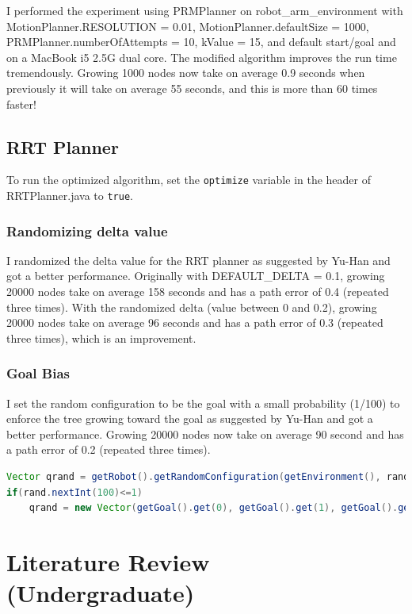 \documentclass[9.5pt]{extarticle}
\begin{document}
I performed the experiment using PRMPlanner on robot\_arm\_environment with MotionPlanner.RESOLUTION = 0.01, MotionPlanner.defaultSize = 1000, PRMPlanner.numberOfAttempts = 10, kValue = 15, and default start/goal and on a MacBook i5 2.5G dual core. The modified algorithm improves the run time tremendously. Growing 1000 nodes now take on average 0.9 seconds when previously it will take on average 55 seconds, and this is more than 60 times faster!


\subsection{RRT Planner}

To run the optimized algorithm, set the \verb`optimize` variable in the header of RRTPlanner.java to \verb`true`.

\subsubsection{Randomizing delta value}

I randomized the delta value for the RRT planner as suggested by Yu-Han and got a better performance. Originally with DEFAULT\_DELTA = 0.1, growing 20000 nodes take on average 158 seconds and has  a path error of 0.4 (repeated three times). With the randomized delta (value between 0 and 0.2), growing 20000 nodes take on average 96 seconds and has a path error of 0.3 (repeated three times), which is an improvement. 

\subsubsection{Goal Bias}

I set the random configuration to be the goal with a small probability (1/100) to enforce the tree growing toward the goal as suggested by Yu-Han and got a better performance. Growing 20000 nodes now take on average 90 second and has a path error of 0.2 (repeated three times).

\begin{lstlisting}[language=java,caption={Java code for goal bias}]
Vector qrand = getRobot().getRandomConfiguration(getEnvironment(), random);
if(rand.nextInt(100)<=1)
	qrand = new Vector(getGoal().get(0), getGoal().get(1), getGoal().get(2));
\end{lstlisting}



\section{Literature Review (Undergraduate)}
\end{document}

